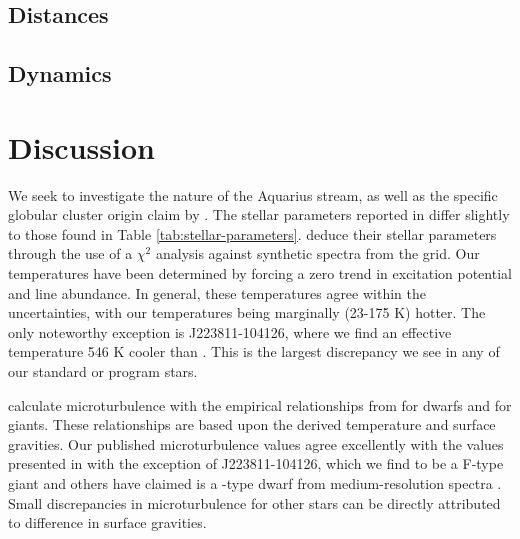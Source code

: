 \documentclass{emulateapj}
\begin{document}


\subsection{Distances}



\subsection{Dynamics}




\section{Discussion}



We seek to investigate the nature of the Aquarius stream, as well as the specific globular cluster origin claim by \citet{wylie-de-boer;et-al_2012}. The stellar parameters reported in \citet{wylie-de-boer;et-al_2012} differ slightly to those found in Table \ref{tab:stellar-parameters}. \citet{wylie-de-boer;et-al_2012} deduce their stellar parameters through the use of a $\chi^2$ analysis against synthetic spectra from the \citet{munari;et-al_2005} grid. Our temperatures have been determined by forcing a zero trend in excitation potential and line abundance. In general, these temperatures agree within the uncertainties, with our temperatures being marginally (23-175 K) hotter. The only noteworthy exception is J223811-104126, where we find an effective temperature 546 K cooler than \citet{wylie-de-boer;et-al_2012}. This is the largest discrepancy we see in any of our standard or program stars. 


\citet{wylie-de-boer;et-al_2012} calculate microturbulence with the empirical relationships from \citet{Reddy;et-al_2003} for dwarfs and \citet{fulbright_2000} for giants. These relationships are based upon the derived temperature and surface gravities. Our published microturbulence values agree excellently with the values presented in \citet{wylie-de-boer;et-al_2012} with the exception of J223811-104126, which we find to be a F-type giant and others have claimed is a -type dwarf from medium-resolution spectra \citep{wylie-de-boer;et-al_2012, williams;et-al_2011}. Small discrepancies in microturbulence for other stars can be directly attributed to difference in surface gravities.
\end{document}
